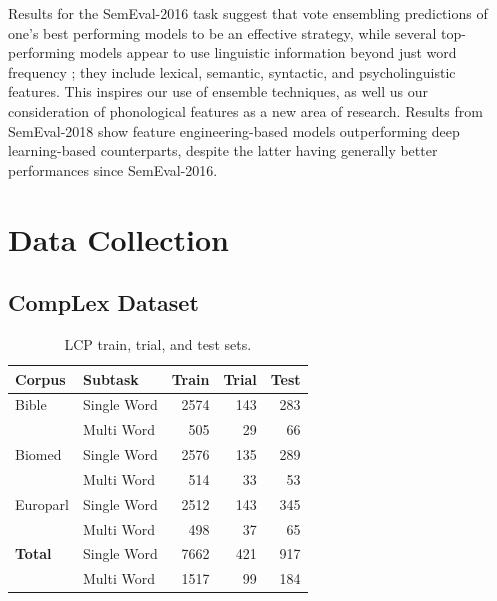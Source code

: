 \documentclass{dcthesis}
\theoremstyle{definition}
\theoremstyle{remark}
\begin{document}
Results for the SemEval-2016 task \citep{zampieri2017complex} suggest that vote ensembling predictions of one's best performing models to be an effective strategy, while several top-performing models appear to use linguistic information beyond just word frequency \citep{paetzold2016sv000gg, ronzano2016taln, mukherjee2016ju_nlp}; they include lexical, semantic, syntactic, and psycholinguistic features. This inspires our use of ensemble techniques, as well us our consideration of phonological features as a new area of research. Results from SemEval-2018 show feature engineering-based models outperforming deep learning-based counterparts, despite the latter having generally better performances since SemEval-2016.

\chapter{Data Collection}

\section{CompLex Dataset}

\begin{table}
  \centering
  \begin{tabular}{l|l|r|r|r}
    \hline
    \centering
    \textbf{Corpus} & \textbf{Subtask} & \textbf{Train} &  \textbf{Trial} &  \textbf{Test} \\
    \hline
    Bible & Single Word &   2574 &    143 &   283 \\
            & Multi Word &    505 &     29 &    66 \\
    Biomed & Single Word &   2576 &    135 &   289 \\
            & Multi Word &    514 &     33 &    53 \\
    Europarl & Single Word &   2512 &    143 &   345 \\
            & Multi Word &    498 &     37 &    65 \\
    \hline
    \textbf{Total} & Single Word & 7662 & 421 & 917 \\
          & Multi Word &    1517 &     99 &    184 \\
    \hline
  \end{tabular}
  \caption{\label{tab:datasets} LCP train, trial, and test sets.}
\end{table}
\end{document}
